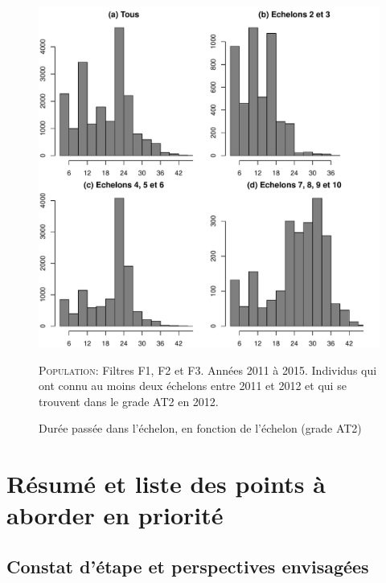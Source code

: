 \documentclass[11pt,a4paper]{article}
\begin{document}
\begin{figure}[ht] 
  \caption{Durée passée dans l'échelon, en fonction de l'échelon (grade AT2)}
  \label{duree_by_ech} 
    \includegraphics[scale = 0.6]{duree_ech_AT2.pdf} 
      \begin{minipage}{12cm}
\footnotesize
\textsc{Population:} Filtres F1, F2 et F3. Années 2011 à 2015. Individus qui ont connu au moins deux échelons entre 2011 et 2012 et qui se trouvent dans le grade AT2 en 2012. 
\end{minipage}
\end{figure}






\clearpage



\clearpage
\section{Résumé et liste des points à aborder en priorité}

\subsection*{Constat d'étape et perspectives envisagées}
\end{document}
